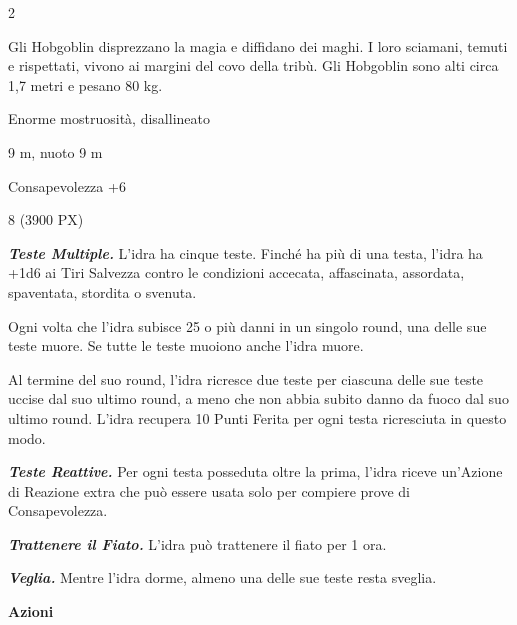 \begin{multicols}{2}
{Gli Hobgoblin disprezzano la magia e diffidano dei maghi. I loro sciamani, temuti e rispettati, vivono ai margini del covo della tribù. Gli Hobgoblin sono alti circa 1,7 metri e pesano 80 kg.

\begin{description}[noitemsep, topsep=0pt, parsep=0pt, partopsep=0pt, itemsep=1pt, leftmargin=2.35cm,  labelwidth=2.2cm, itemindent=0cm, listparindent=0pt] %
\setlength{\baselineskip}{10pt}
\item[\textbf{Taglia/Tipo}] Enorme mostruosità, disallineato
\item[\textbf{Caratt.}] 
\item[\textbf{Punti Ferita}] 
\item[\textbf{Movimento}] 9 m, nuoto 9 m
\item[\textbf{Tiri Salvez.}] 
\item[\textbf{Comp.}] Consapevolezza +6
\item[\textbf{Sensi}] 
\item[\textbf{Sfida}] 8 (3900 PX)
\end{description}
\smallskip

\emph{\textbf{Teste Multiple.}} L'idra ha cinque teste. Finché ha più di una testa, l'idra ha +1d6 ai Tiri Salvezza contro le condizioni accecata, affascinata, assordata, spaventata, stordita o svenuta.

Ogni volta che l'idra subisce 25 o più danni in un singolo round, una delle sue teste muore. Se tutte le teste muoiono anche l'idra muore.

Al termine del suo round, l'idra ricresce due teste per ciascuna delle sue teste uccise dal suo ultimo round, a meno che non abbia subito danno da fuoco dal suo ultimo round. L'idra recupera 10 Punti Ferita per ogni testa ricresciuta in questo modo.

\emph{\textbf{Teste Reattive.}} Per ogni testa posseduta oltre la prima, l'idra riceve un'Azione di Reazione extra che può essere usata solo per compiere prove di Consapevolezza.

\emph{\textbf{Trattenere il Fiato.}} L'idra può trattenere il fiato per 1 ora.

\emph{\textbf{Veglia.}} Mentre l'idra dorme, almeno una delle sue teste resta sveglia.

\textbf{Azioni}

}
\end{multicols}
